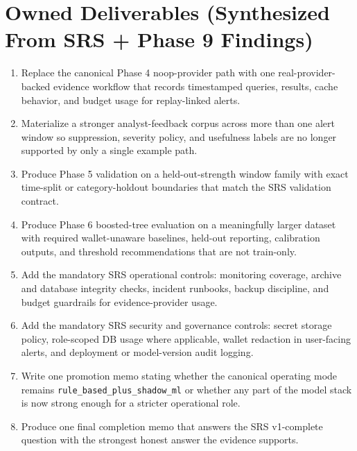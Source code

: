 \documentclass{article}
\begin{document}
\section*{Owned Deliverables (Synthesized From SRS + Phase 9 Findings)}
\begin{enumerate}
\item Replace the canonical Phase 4 noop-provider path with one real-provider-backed evidence workflow that records timestamped queries, results, cache behavior, and budget usage for replay-linked alerts.
\item Materialize a stronger analyst-feedback corpus across more than one alert window so suppression, severity policy, and usefulness labels are no longer supported by only a single example path.
\item Produce Phase 5 validation on a held-out-strength window family with exact time-split or category-holdout boundaries that match the SRS validation contract.
\item Produce Phase 6 boosted-tree evaluation on a meaningfully larger dataset with required wallet-unaware baselines, held-out reporting, calibration outputs, and threshold recommendations that are not train-only.
\item Add the mandatory SRS operational controls: monitoring coverage, archive and database integrity checks, incident runbooks, backup discipline, and budget guardrails for evidence-provider usage.
\item Add the mandatory SRS security and governance controls: secret storage policy, role-scoped DB usage where applicable, wallet redaction in user-facing alerts, and deployment or model-version audit logging.
\item Write one promotion memo stating whether the canonical operating mode remains \texttt{rule\_based\_plus\_shadow\_ml} or whether any part of the model stack is now strong enough for a stricter operational role.
\item Produce one final completion memo that answers the SRS v1-complete question with the strongest honest answer the evidence supports.
\end{enumerate}
\end{document}
